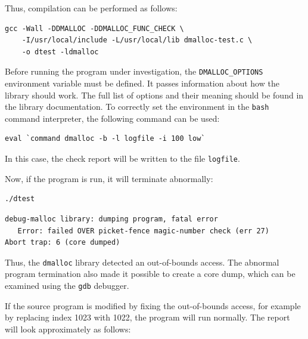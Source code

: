 Thus, compilation can be performed as follows:

\begin{verbatim}
gcc -Wall -DDMALLOC -DDMALLOC_FUNC_CHECK \
    -I/usr/local/include -L/usr/local/lib dmalloc-test.c \
    -o dtest -ldmalloc
\end{verbatim}

Before running the program under investigation, the \texttt{DMALLOC\_OPTIONS} environment variable
must be defined. It passes information about how the library should work. The full list of options
and their meaning should be found in the library documentation. To correctly set the environment
in the \texttt{bash} command interpreter, the following command can be used:

\begin{verbatim}
eval `command dmalloc -b -l logfile -i 100 low`
\end{verbatim}

In this case, the check report will be written to the file \texttt{logfile}.

Now, if the program is run, it will terminate abnormally:

\begin{verbatim}
./dtest
\end{verbatim}

\begin{verbatim}
debug-malloc library: dumping program, fatal error
   Error: failed OVER picket-fence magic-number check (err 27)
Abort trap: 6 (core dumped)
\end{verbatim}

Thus, the \texttt{dmalloc} library detected an out-of-bounds access. The abnormal program
termination also made it possible to create a core dump, which can be examined using the
\texttt{gdb} debugger.

If the source program is modified by fixing the out-of-bounds access, for example by replacing
index 1023 with 1022, the program will run normally. The report will look approximately as
follows:


